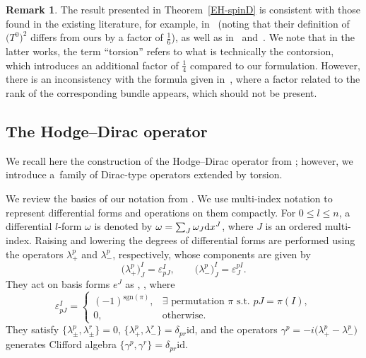 \documentclass[pdftex]{sigma}
\numberwithin{equation}{section}
\theoremstyle{definition}
\newtheorem{Remark}[Theorem]{Remark}
\begin{document}
\begin{Remark}
The result presented in Theorem~\ref{EH-spinD} is consistent with those found in the existing literature, for example, in~\cite[p.~879]{hanisch10} (noting that their definition of $\bigl(T^0\bigr)^2$ differs from ours by a factor of $\frac{1}{6}$), as well as in~\cite[Proposition~5.4]{Pfaffle12} and~\cite[Section~5.2]{Kalau95}. We note that in the latter works, the term ``torsion'' refers to what is technically the contorsion, which introduces an additional factor of $\frac{1}{4}$ compared to our formulation.
However, there is an inconsistency with the formula given in~\cite[Lemma~3.1]{Ackermann96}, where a factor related to the rank of the corresponding bundle appears, which should not be present.
\end{Remark}

\subsection{The Hodge--Dirac operator}
We recall here the construction of the Hodge--Dirac operator from \cite{dabrowski2024a}; however, we introduce a~family of Dirac-type operators extended by torsion.

We review the basics of our notation from \cite{dabrowski2024a}. We use multi-index notation to represent differential forms and operations on them compactly. For $0\leq l\leq n$, a differential $l$-form $\omega$ is denoted by $\omega=\sum_{J} \omega_J {\rm d}x^J$, where $J$ is an ordered multi-index. Raising and lowering the degrees of differential forms are performed using the operators $\lambda^p_+$ and $\lambda_-^p$, respectively, whose components are given by
\[
 \bigl(\lambda^p_+\bigr)^I_J=\varepsilon^I_{pJ}, \qquad \bigl(\lambda^p_-\bigr)^I_J=\varepsilon^{pI}_J.
\]
They act on basis forms $e^J$ as
 ,
 ,
where
\[
 \varepsilon^{I}_{pJ}=\begin{cases}
 (-1)^{\mathrm{sgn}(\pi)}, & \exists \mbox{ permutation } \pi \mbox{ s.t. } pJ=\pi(I),\\
 0, & \mbox{otherwise}.
 \end{cases}
\]
They satisfy
$
 \bigl\{\lambda_\pm^p,\lambda_\pm^r\bigr\}=0$, $ \bigl\{\lambda^p_+,\lambda^r_-\bigr\}=\delta_{pr}\mathrm{id}$,
and the operators $\gamma^p=-i\bigl(\lambda^p_+-\lambda^p_-\bigr)$ generates Clifford algebra $\{\gamma^p,\gamma^r\}=\delta_{pr}\mathrm{id}$.
\end{document}
